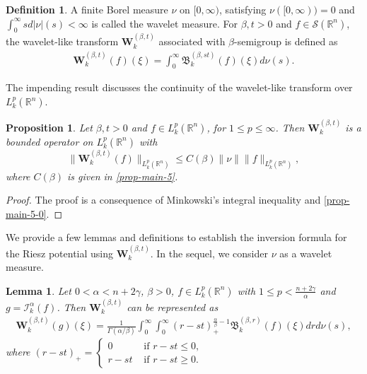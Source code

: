 \documentclass[11pt,a4paper,reqno]{amsproc}
\newtheorem{lemma}[theorem]{Lemma}
\newtheorem{proposition}[theorem]{Proposition}
\theoremstyle{definition}
\newtheorem{definition}[theorem]{Definition}
\theoremstyle{remark}
\numberwithin{equation}{section}
\begin{document}
\begin{definition}
    A finite Borel measure $\nu$ on $[0, \infty)$, satisfying  $\nu([0, \infty)) = 0$ and $\int_0^\infty sd|\nu|(s)<\infty$ is called the wavelet measure. For $\beta, t >0$ and $f \in \mathcal{S}(\mathbb{R}^n)$, the wavelet-like transform $\mathbf{W}_k^{(\beta,t)}$ associated with $\beta$-semigroup  is defined as 
\begin{align} \label{wavlet}
\mathbf{W}_k^{(\beta,t)} (f)(\xi) = \int_0^\infty \mathfrak{B}_k^{(\beta, st)}(f)(\xi) d\nu(s).
\end{align}
\end{definition} 
The impending result discusses the continuity of the wavelet-like transform over $L_k^p(\mathbb{R}^n)$.
\begin{proposition}
    Let $\beta , t >0$ and $f\in L_k^p(\mathbb{R}^n)$, for $1\leq p \leq \infty$. Then 
    $\mathbf{W}_k^{(\beta, t)}$ is a bounded operator on $L_k^p(\mathbb{R}^n)$  with $$\|\mathbf{W}_k^{(\beta,t)} (f)\|_{L_k^p(\mathbb{R}^n)} \leq C({\beta}) \|\nu\| \|f\|_{L_k^p(\mathbb{R}^n)},$$ where $C(\beta)$ is given in \eqref{prop-main-5}.
\end{proposition}
\begin{proof}
    The proof is a consequence of Minkowski's integral inequality and \eqref{prop-main-5-0}. 
\end{proof}
\noindent We provide a few lemmas and definitions to establish the inversion formula for the Riesz potential using $\mathbf{W}_k^{(\beta,t)}$. In the sequel, we consider $\nu$ as a wavelet measure.
\begin{lemma} \label{Lemma-R-1}
     Let $0< \alpha < n+2\gamma$, $\beta >0 $, $f\in L_k^p(\mathbb{R}^n)$ with $1\leq p < \frac{n+2\gamma}{\alpha}$ and $g=\mathcal{I}_k^\alpha(f)$. Then $\mathbf{W}_k^{(\beta, t)}$ can be represented as 
     \begin{align*}
         \mathbf{W}_k^{(\beta, t)}(g)(\xi)= \frac{1}{\Gamma(\alpha / \beta)} \int_0^\infty \int_{0}^\infty (r-st)_+^{\frac{\alpha}{\beta}-1} \mathfrak{B}_k^{(\beta, r)}(f)(\xi) dr d\nu(s),
    \end{align*}  
 where $ (r-st)_+ =
\begin{cases} 
  0 & \text{ if } r-st \leq 0,\\ 
  r-st & \text{ if } r-st \geq 0.   
\end{cases} $ 
\end{lemma}
\end{document}
